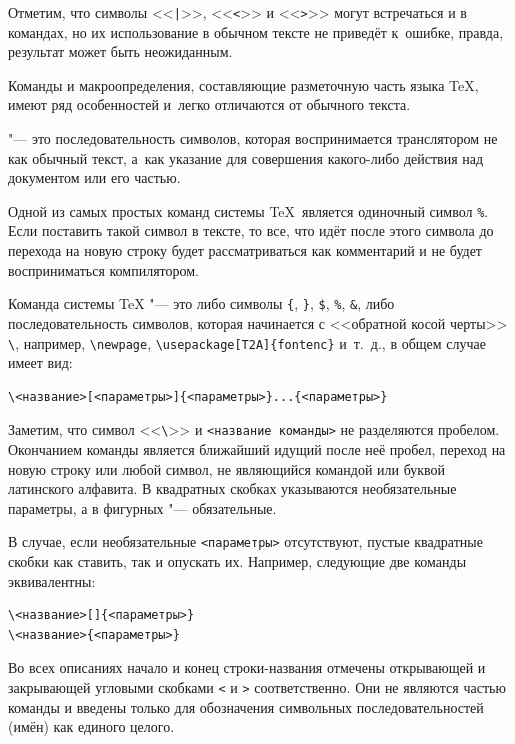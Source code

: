 \begin{note}
Отметим, что символы <<\verb"|">>, <<\verb|<|>> и <<\verb|>|>> могут встречаться и в командах, но их использование в обычном тексте не приведёт к~ошибке, правда, результат может быть неожиданным.
\end{note}

Команды и макроопределения, составляющие разметочную часть языка \TeX, имеют ряд особенностей и~легко отличаются от обычного текста. %

 "--- это последовательность символов, которая воспринимается транслятором не как обычный текст, а~как указание для совершения какого-либо действия над документом или его частью.

Одной из самых простых команд системы \TeX\ является одиночный символ \verb|%|. Если поставить такой символ в тексте, то все, что идёт после этого символа до перехода на новую строку будет рассматриваться как комментарий и не будет восприниматься компилятором.

Команда системы \TeX{} "--- это либо символы \verb|{|, \verb|}|, \verb|$|, \verb|%|, \verb|&|, либо последовательность символов, которая начинается с <<обратной косой черты>> \verb|\|, например, \verb|\newpage|, \verb|\usepackage[T2A]{fontenc}| и~т.~д., в общем случае имеет вид:
\begin{verbatim}
\<название>[<параметры>]{<параметры>}...{<параметры>}
\end{verbatim}
Заметим, что символ <<\verb|\|>> и \verb|<название команды>| не разделяются пробелом. Окончанием команды является ближайший идущий после неё пробел, переход на новую строку или любой символ, не являющийся командой или буквой латинского алфавита. В квадратных скобках указываются необязательные параметры, а в фигурных "--- обязательные.

В случае, если необязательные \texttt{<параметры>} отсутствуют,  пустые квадратные скобки как ставить, так и опускать их. Например, следующие две команды эквивалентны:
\begin{verbatim}
\<название>[]{<параметры>}
\<название>{<параметры>}
\end{verbatim}

\begin{note}
Во всех описаниях начало и конец строки-названия отмечены открывающей и закрывающей угловыми скобками \verb|<| и \verb|>| соответственно. Они не являются частью команды и введены только для обозначения символьных последовательностей (имён) как единого целого.
\end{note}

